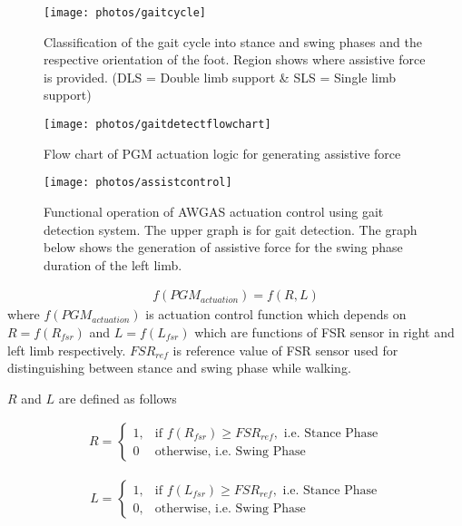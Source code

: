 \documentclass[paper,JRM,paper]{jaciiiarticle}
\begin{document}
\begin{figure}[h]
	\centering
	\texttt{[image: photos/gaitcycle]}
	\caption{Classification of the gait cycle into stance and swing phases and the respective orientation of the foot. Region shows where assistive force is provided. (DLS = Double limb support \& SLS = Single limb support) }
	\label{fig:gaitcycle}
\end{figure}

\begin{figure}[h]
	\centering
	\texttt{[image: photos/gaitdetectflowchart]}
	\caption{Flow chart of PGM actuation logic for generating assistive force}
	\label{fig:gaitdetectflowchart}
\end{figure}

\begin{figure}
	\centering
	\texttt{[image: photos/assistcontrol]}
	\caption{Functional operation of AWGAS actuation control using gait detection system. The upper graph is for gait detection. The graph below shows the generation of assistive force for the swing phase duration of the left limb.}
	\label{fig:assistcontrol}
\end{figure}

\begin{align}\label{eq:actu1}
f(PGM_{actuation}) = f(R,L)
\end{align}
where
$f(PGM_{actuation})$ is actuation control function which depends on $R = f(R_{fsr})$ and $L = f(L_{fsr})$ which are functions of FSR sensor in right and left limb respectively. 
$FSR_{ref}$ is reference value of FSR sensor used for distinguishing between stance and swing phase while walking. 	

$R$ and $L$ are defined as follows

\begin{align}\label{eq:rfsr}
R= ^{}
\begin{cases}
1,& \text{if } f(R_{fsr}) \geq FSR_{ref}, \text{  i.e. Stance Phase}\\
0              & \text{otherwise, i.e. Swing Phase}
\end{cases}
\end{align}

\begin{align}\label{eq:lfsr}
L= ^{}
\begin{cases}
1,& \text{if } f(L_{fsr}) \geq FSR_{ref}, \text{  i.e. Stance Phase}\\
0,              & \text{otherwise, i.e. Swing Phase}
\end{cases}
\end{align}
\end{document}
